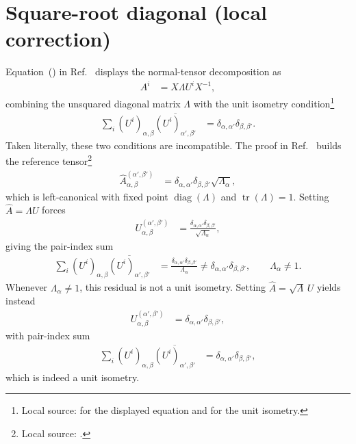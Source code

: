 \documentclass{article}
\providecommand{\tr}{\operatorname{tr}}
\begin{document}
\section{Square-root diagonal (local correction)}
\label{sec:cpsv16_square_root_correction}

Equation~() in Ref.~\cite{Cirac2016MPDO_arXiv} displays
the normal-tensor decomposition as
\begin{align}
    A^i
        &=
    X\Lambda U^iX^{-1},
    \label{eq:cpsv16_source_normal_tensor_form}
\end{align}
combining the unsquared diagonal matrix $\Lambda$ with the unit isometry
condition\footnote{Local source:
 for the displayed equation and
 for the unit isometry.}
\begin{align}
    \sum_i
    (U^i)_{\alpha,\beta}
    \overline{(U^i)_{\alpha',\beta'}}
        &=
    \delta_{\alpha,\alpha'}\delta_{\beta,\beta'}.
    \label{eq:cpsv16_source_normal_tensor_unit_isometry}
\end{align}
Taken literally, these two conditions are incompatible. The proof in
Ref.~\cite{Cirac2016MPDO_arXiv} builds the reference tensor\footnote{Local
source: .}
\begin{align}
    \widehat A^{(\alpha',\beta')}_{\alpha,\beta}
        &=
    \delta_{\alpha,\alpha'}\delta_{\beta,\beta'}
    \sqrt{\Lambda_\alpha},
    \label{eq:cpsv16_source_reference_tensor}
\end{align}
which is left-canonical with fixed point $\operatorname{diag}(\Lambda)$ and
$\tr(\Lambda)=1$. Setting $\widehat A=\Lambda U$ forces
\begin{align}
    U^{(\alpha',\beta')}_{\alpha,\beta}
        &=
    \frac{\delta_{\alpha,\alpha'}\delta_{\beta,\beta'}}
         {\sqrt{\Lambda_\alpha}},
    \label{eq:cpsv16_residual_after_full_diagonal}
\end{align}
giving the pair-index sum
\begin{align}
    \sum_i
    (U^i)_{\alpha,\beta}
    \overline{(U^i)_{\alpha',\beta'}}
        &=
    \frac{\delta_{\alpha,\alpha'}\delta_{\beta,\beta'}}
         {\Lambda_\alpha}
        \ne
    \delta_{\alpha,\alpha'}\delta_{\beta,\beta'},
    \qquad
    \Lambda_\alpha\ne1.
    \label{eq:cpsv16_full_diagonal_nonunit_residual}
\end{align}
Whenever $\Lambda_\alpha\ne1$, this residual is not a unit isometry. Setting
$\widehat A=\sqrt{\Lambda}\,U$ yields instead
\begin{align}
    U^{(\alpha',\beta')}_{\alpha,\beta}
        &=
    \delta_{\alpha,\alpha'}\delta_{\beta,\beta'},
    \label{eq:cpsv16_residual_after_square_root_diagonal}
\end{align}
with pair-index sum
\begin{align}
    \sum_i
    (U^i)_{\alpha,\beta}
    \overline{(U^i)_{\alpha',\beta'}}
        &=
    \delta_{\alpha,\alpha'}\delta_{\beta,\beta'},
    \label{eq:cpsv16_square_root_unit_residual}
\end{align}
which is indeed a unit isometry.
\end{document}
